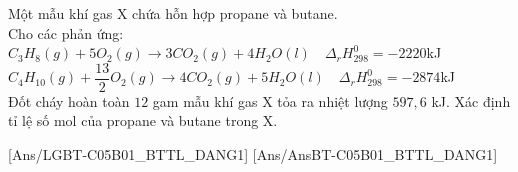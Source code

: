 \documentclass[Main.tex]{subfiles}
\begin{document}
	\begin{bt}
		Một mẫu khí gas X chứa hỗn hợp propane và butane.
		\\
		Cho các phản ứng: $C_3H_8(g) + 5O_2(g) \longrightarrow 3CO_2(g) + 4H_2O(l) \quad \Delta_r H_{298}^0 = -2220$kJ
		\\
		$C_4H_{10}(g) + \dfrac{13}{2}O_2(g) \longrightarrow 4CO_2(g) + 5H_2O(l) \quad \Delta_r H_{298}^0 = -2874$kJ
		\\
		Đốt cháy hoàn toàn $12$ gam mẫu khí gas X tỏa ra nhiệt lượng $597{,}6$ kJ. Xác định tỉ lệ số mol của propane và butane trong X.
	\end{bt}
	[Ans/LGBT-C05B01_BTTL_DANG1]
	[Ans/AnsBT-C05B01_BTTL_DANG1]
\end{document}
